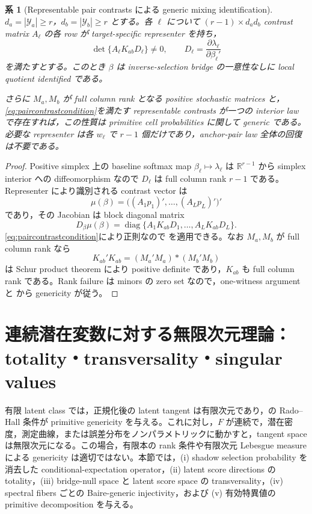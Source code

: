 \documentclass[11pt,a4paper]{ltjsarticle}
\newtheorem{corollary}{系}[section]
\theoremstyle{remark}
\newcommand{\R}{\mathbb R}
\newcommand{\cY}{\mathcal Y}
\begin{document}
\begin{corollary}[Representable pair contrasts による generic mixing identification]\label{cor:mixinggeneric}
$d_a=|\cY_a|\ge r$，$d_b=|\cY_b|\ge r$ とする。各 $\ell$ について $(r-1)\times d_ad_b$ contrast matrix $A_\ell$ の各 row が target-specific representer を持ち，
\begin{equation}
\det\{A_\ell K_{ab}D_\ell\}\neq0,
\qquad
D_\ell=\frac{\partial\lambda_\ell}{\partial\beta_\ell'}
\label{eq:paircontrastcondition}
\end{equation}
を満たすとする。このとき $\beta$ は inverse-selection bridge の一意性なしに local quotient identified である。

さらに $M_a,M_b$ が full column rank となる positive stochastic matrices と，\eqref{eq:paircontrastcondition}を満たす representable contrasts が一つの interior law で存在すれば，この性質は primitive cell probabilities に関して generic である。必要な representer は各 $w_\ell$ で $r-1$ 個だけであり，anchor-pair law 全体の回復は不要である。
\end{corollary}

\begin{proof}
Positive simplex 上の baseline softmax map $\beta_\ell\mapsto\lambda_\ell$ は $\R^{r-1}$ から simplex interior への diffeomorphism なので $D_\ell$ は full column rank $r-1$ である。Representer により識別される contrast vector は
\[
\mu(\beta)
=\bigl((A_1p_1)',\ldots,(A_Lp_L)'\bigr)'
\]
であり，その Jacobian は block diagonal matrix
\[
D_\beta\mu(\beta)
=\operatorname{diag}\{A_1K_{ab}D_1,\ldots,A_LK_{ab}D_L\}.
\]
\eqref{eq:paircontrastcondition}により正則なので を適用できる。なお $M_a,M_b$ が full column rank なら
\[
K_{ab}'K_{ab}=(M_a'M_a)\ast(M_b'M_b)
\]
は Schur product theorem により positive definite であり，$K_{ab}$ も full column rank である。Rank failure は minors の zero set なので，one-witness argument と から genericity が従う。
\end{proof}

\section{連続潜在変数に対する無限次元理論：totality・transversality・singular values}\label{sec:continuousprimitive}

有限 latent class では，正規化後の latent tangent は有限次元であり，の Rado--Hall 条件が primitive genericity を与える。これに対し，$F$ が連続で，潜在密度，測定曲線，または誤差分布をノンパラメトリックに動かすと，tangent space は無限次元になる。この場合，有限本の rank 条件や有限次元 Lebesgue measure による genericity は適切ではない。本節では，(i) shadow selection probability を消去した conditional-expectation operator，(ii) latent score directions の totality，(iii) bridge-null space と latent score space の transversality，(iv) spectral fibers ごとの Baire-generic injectivity，および (v) 有効特異値の primitive decomposition を与える。
\end{document}
